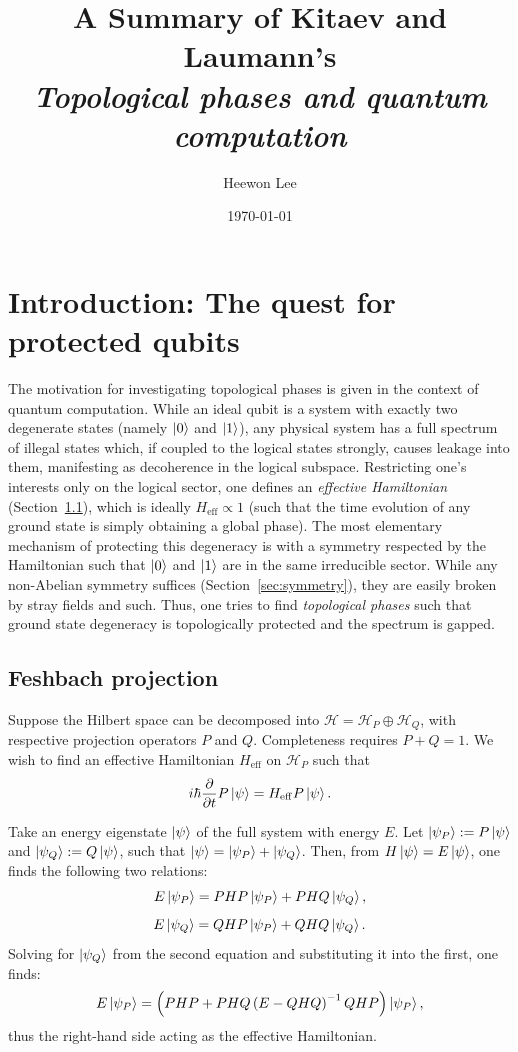 \documentclass{article}
\title{A Summary of Kitaev and Laumann's\\\emph{Topological phases and quantum computation}}
\author{Heewon Lee}
\date{\today}
\newcommand{\hilbert}{\mathcal{H}}
\newcommand{\Heff}{H_{\mathrm{eff}}}
\begin{document}
\maketitle

\section{Introduction: The quest for protected qubits}
The motivation for investigating topological phases is given in the context of quantum computation.
While an ideal qubit is a system with exactly two degenerate states
(namely $\ket{0}$ and $\ket{1}$),
any physical system has a full spectrum of illegal states which,
if coupled to the logical states strongly, causes leakage into them,
manifesting as decoherence in the logical subspace.
Restricting one's interests only on the logical sector,
one defines an \emph{effective Hamiltonian} (Section~\ref{sec:feshbach}),
which is ideally $\Heff \propto 1$
(such that the time evolution of any ground state is simply obtaining a global phase).
The most elementary mechanism of protecting this degeneracy is
with a symmetry respected by the Hamiltonian such that $\ket{0}$ and $\ket{1}$
are in the same irreducible sector.
While any non-Abelian symmetry suffices (Section~\ref{sec:symmetry}), they are easily broken by stray fields and such.
Thus, one tries to find \emph{topological phases}
such that ground state degeneracy is topologically protected
and the spectrum is gapped.

\subsection{Feshbach projection}\label{sec:feshbach}
Suppose the Hilbert space can be decomposed into $\hilbert = \hilbert_P \oplus \hilbert_Q$,
with respective projection operators $P$ and $Q$.
Completeness requires $P + Q = 1$.
We wish to find an effective Hamiltonian $\Heff$ on $\hilbert_P$ such that
\[
    i\hbar\frac{\partial}{\partial t} P \ket{\psi} = \Heff P\ket{\psi}.
\]

Take an energy eigenstate $\ket{\psi}$ of the full system with energy $E$.
Let $\ket{\psi_P} := P \ket{\psi}$ and $\ket{\psi_Q} := Q\ket{\psi}$,
such that $\ket{\psi} = \ket{\psi_P} + \ket{\psi_Q}$.
Then, from $H\ket{\psi} = E\ket{\psi}$, one finds the following two relations:
\[
    E\ket{\psi_P} = PHP\ket{\psi_P} + PHQ\ket{\psi_Q},
\]
\[
    E\ket{\psi_Q} = QHP\ket{\psi_P} + QHQ\ket{\psi_Q}.
\]
Solving for $\ket{\psi_Q}$ from the second equation and substituting it into the first, one finds:
\[
    E\ket{\psi_P} = \left( PHP + PHQ \left(E-QHQ\right)^{-1} QHP \right) \ket{\psi_P},
\]
thus the right-hand side acting as the effective Hamiltonian.
\end{document}

